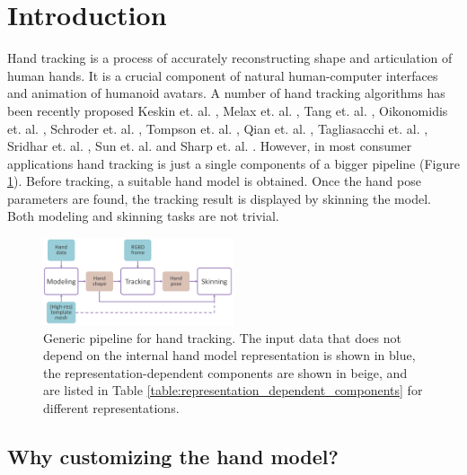 \section{Introduction}


Hand tracking is a process of accurately reconstructing shape and articulation of human hands. It is a crucial component of natural human-computer interfaces and animation of humanoid avatars. A number of hand tracking algorithms has been recently proposed  Keskin et. al. \cite{keskin2012hand}, Melax et. al. \cite{melax2013dynamics}, Tang et. al. \cite{tang2013real}, Oikonomidis et. al. \cite{oikonomidis2014evolutionary}, Schroder et. al. \cite{schroder2014real},
Tompson et. al. \cite{tompson2014real}, Qian et. al. \cite{qian2014realtime},  Tagliasacchi et. al. \cite{tagliasacchi2015robust}, Sridhar et. al. \cite{sridhar2015fast}, Sun et. al. \cite{sun2015cascaded} and Sharp et. al. \cite{sharp2015accurate}.
However, in most consumer applications hand tracking is just a single components of a bigger pipeline (Figure \ref{fig:generic_pipeline}). Before tracking, a suitable hand model is obtained. Once the hand pose parameters are found, the tracking result is displayed by skinning the model. Both modeling and skinning tasks are not trivial.

\begin{figure}[h!] 
	\centering
	\includegraphics[width=0.5\textwidth]{fig/generic_pipeline}
	\caption{Generic pipeline for hand tracking. The input data that does not depend on the internal hand model representation is shown in blue, the representation-dependent components are shown in beige, and are listed in Table \ref{table:representation_dependent_components} for different representations.}
	\label{fig:generic_pipeline}
\end{figure}


\subsection{Why customizing the hand model?}

